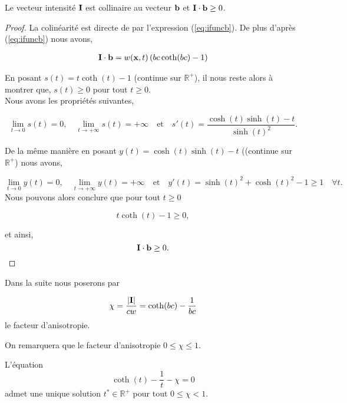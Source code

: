 \begin{proposition}
\label{prop:collineaire}
Le vecteur intensité $\mathbf{I}$ est collinaire au vecteur $\mathbf{b}$ et $\mathbf{I} \cdot \mathbf{b} \geq 0$.
\end{proposition}

\begin{proof}
 La colinéarité est directe de par l'expression 
(\ref{eq:ifuncb}). De plus d'après (\ref{eq:ifuncb}) nous avons, 

\begin{equation}
\begin{aligned}
    \mathbf{I} \cdot \mathbf{b} &= w(\mathbf{x},t)\left(bc\coth(bc) - 1\right)\\
\end{aligned}
\end{equation}

En posant $s(t) = t\coth(t) - 1$ (continue sur $\mathbb{R}^+$), il nous reste 
alors à montrer que,
$s(t) \geq 0$ pour tout $t\geq0$.\\
Nous avons les propriétés suivantes,
 
$$  
\lim_{t\to 0} s(t) = 0, \quad \lim_{t\to +\infty} s(t) = +\infty  \quad \mbox{et} \quad 
s'(t) = \frac{ \cosh(t)\sinh(t) - t }{\sinh(t)^2}.
$$

De la même manière en posant $y(t) = \cosh(t)\sinh(t) - t$ 
((continue sur $\mathbb{R}^+$) nous avons,

$$  
\lim_{t\to 0} y(t) = 0,\quad \lim_{t\to +\infty} y(t) = +\infty  \quad \mbox{et} \quad 
y'(t) = \sinh(t)^2 + \cosh(t)^2  - 1 \geq 1 \quad \forall t.
$$
Nous pouvons alors conclure que pour tout $t\geq0$ 

$$
t\coth(t) - 1 \geq 0,
$$

et ainsi,
$$
\mathbf{I} \cdot \mathbf{b} \geq 0.
$$
\end{proof}

Dans la suite nous poserons par

\begin{equation}
  \label{eq:chi}
  \chi = \frac{\left\lvert\mathbf{I}\right\rvert}{c w} = \coth(bc)  
  - \frac{1}{bc}
\end{equation}
le facteur d'anisotropie.

\begin{remark}
On remarquera que le facteur d'anisotropie $0 \leq \chi \leq 1$.
\end{remark}

\begin{proposition}
L'équation 
\begin{equation}
\label{eq:chi2}
   \coth(t) - \frac{1}{t} - \chi   = 0
\end{equation}
admet une unique solution $t^* \in \mathbb{R}^+$ pour tout $0 \leq \chi < 1$.
\end{proposition}

